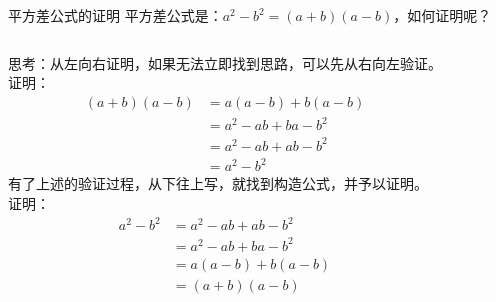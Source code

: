 \documentclass[aspectratio=169]{ctexbeamer} %
\begin{document}
\begin{frame}[t]{平方差公式的证明}
平方差公式是：$a^2 - b^2 = (a + b)(a - b)$，如何证明呢？
\vspace{1cm}
\begin{columns}[t]
思考：从左向右证明，如果无法立即找到思路，可以先从右向左验证。\\
证明：
\begin{align*}
  (a + b)(a - b) &= a(a - b) + b(a - b)  \\
  &= a^2 - ab + ba - b^2 \\
  &= a^2 - ab + ab - b^2 \\
  &= a^2 - b^2
\end{align*}
 有了上述的验证过程，从下往上写，就找到构造公式，并予以证明。\\
 证明：
\begin{align*}
  a^2 - b^2  &= a^2 - ab + ab - b^2 \\
  &= a^2 - ab + ba - b^2 \\
  &= a(a - b) + b(a - b) \\
  &= (a + b)(a - b) 
 \end{align*}
\end{columns}
\end{frame}
\end{document}
